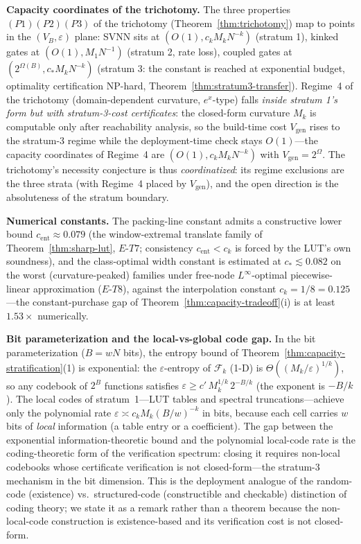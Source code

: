 \vspace{2pt}
\noindent\textbf{Capacity coordinates of the trichotomy.}
The three properties $(P1)(P2)(P3)$ of the trichotomy
(Theorem~\ref{thm:trichotomy}) map to points in the $(V_B, \varepsilon)$
plane: SVNN sits at $(O(1), c_k M_k N^{-k})$ (stratum 1), kinked gates
at $(O(1), M_1 N^{-1})$ (stratum 2, rate loss), coupled gates at
$(2^{\Omega(B)}, c_* M_k N^{-k})$ (stratum 3: the constant is reached
at exponential budget, optimality certification NP-hard,
Theorem~\ref{thm:stratum3-transfer}). Regime~4 of the trichotomy
(domain-dependent curvature, $e^x$-type) falls \emph{inside stratum 1's
form but with stratum-3-cost certificates}: the closed-form curvature
$M_k$ is computable only after reachability analysis, so the
build-time cost $V_{\text{gen}}$ rises to the stratum-3 regime while the
deployment-time check stays $O(1)$---the capacity coordinates of
Regime~4 are $(O(1), c_k M_k N^{-k})$ with $V_{\text{gen}} = 2^{\Omega}$.
The trichotomy's necessity conjecture is thus \textit{coordinatized}:
its regime exclusions are the three strata (with Regime~4 placed by
$V_{\text{gen}}$), and the open direction is the absoluteness of the
stratum boundary.

\vspace{4pt}
\noindent\textbf{Numerical constants.}
The packing-line constant admits a constructive lower bound
$c_{\mathrm{ent}} \approx 0.079$ (the window-extremal translate family of
Theorem~\ref{thm:sharp-lut}, $E$-$T7$; consistency $c_{\mathrm{ent}} <
c_k$ is forced by the LUT's own soundness), and the class-optimal width
constant is estimated at $c_* \lesssim 0.082$ on the worst
(curvature-peaked) families under free-node $L^\infty$-optimal
piecewise-linear approximation ($E$-$T8$), against the interpolation
constant $c_k = 1/8 = 0.125$---the constant-purchase gap of
Theorem~\ref{thm:capacity-tradeoff}(i) is at least $1.53\times$
numerically.

\vspace{4pt}
\noindent\textbf{Bit parameterization and the local-vs-global code gap.}
In the bit parameterization ($B = wN$ bits), the entropy bound of
Theorem~\ref{thm:capacity-stratification}(1) is exponential: the
$\varepsilon$-entropy of $\mathcal{F}_k$ (1-D) is
$\Theta((M_k/\varepsilon)^{1/k})$, so any codebook of $2^B$ functions
satisfies $\varepsilon \geq c'\, M_k^{1/k}\, 2^{-B/k}$ (the exponent is
$-B/k$). The local codes of stratum~1---LUT tables and spectral
truncations---achieve only the polynomial rate $\varepsilon \asymp
c_k M_k (B/w)^{-k}$ in bits, because each cell carries $w$ bits of
\emph{local} information (a table entry or a coefficient). The gap
between the exponential information-theoretic bound and the polynomial
local-code rate is the coding-theoretic form of the verification
spectrum: closing it requires non-local codebooks whose certificate
verification is not closed-form---the stratum-3 mechanism in the bit
dimension. This is the deployment analogue of the random-code
(existence) vs.\ structured-code (constructible and checkable)
distinction of coding theory; we state it as a remark rather than a
theorem because the non-local-code construction is existence-based and
its verification cost is not closed-form.

